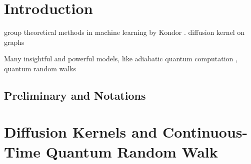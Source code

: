
\section{Introduction}

group theoretical methods in machine learning by Kondor \cite{kondorGroupTheoreticalMethods2008}.
diffusion kernel on graphs \cite{kondorDiffusionKernelsGraphs2002}

Many insightful and powerful models, like adiabatic quantum computation \cite{farhiQuantumComputationAdiabatic2000}, quantum random walks \cite{childsQuantumInformationProcessing2004} 

\subsection{Preliminary and Notations}

\section{Diffusion Kernels and Continuous-Time Quantum Random Walk}

